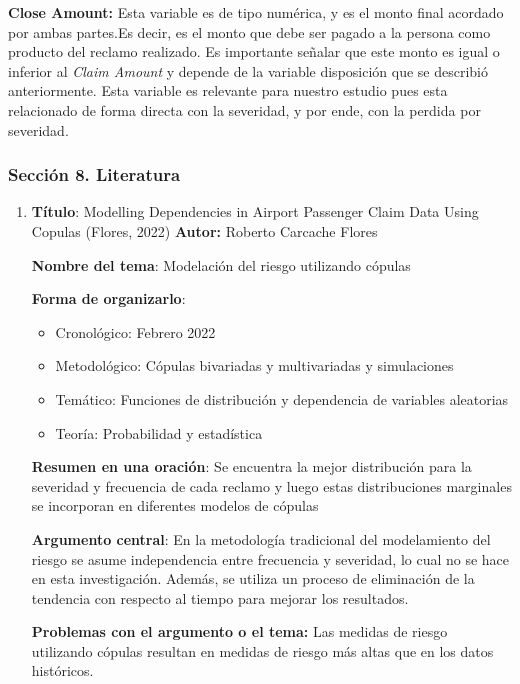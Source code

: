 \documentclass[
  letterpaper,
  onepage,
  openany]{scrreprt}
\begin{document}
\textbf{Close Amount:} Esta variable es de tipo numérica, y es el monto
final acordado por ambas partes.Es decir, es el monto que debe ser
pagado a la persona como producto del reclamo realizado. Es importante
señalar que este monto es igual o inferior al \emph{Claim Amount} y
depende de la variable disposición que se describió anteriormente. Esta
variable es relevante para nuestro estudio pues esta relacionado de
forma directa con la severidad, y por ende, con la perdida por
severidad.

\hypertarget{secciuxf3n-8.-literatura}{%
\subsubsection{Sección 8. Literatura}\label{secciuxf3n-8.-literatura}}

\begin{enumerate}
\def\labelenumi{\arabic{enumi}.}
\item
  \textbf{Título}: Modelling Dependencies in Airport Passenger Claim
  Data Using Copulas (Flores, 2022) \textbf{Autor:} Roberto Carcache
  Flores

  \textbf{Nombre del tema}: Modelación del riesgo utilizando cópulas

  \textbf{Forma de organizarlo}:

  \begin{itemize}
  \item
    Cronológico: Febrero 2022
  \item
    Metodológico: Cópulas bivariadas y multivariadas y simulaciones
  \item
    Temático: Funciones de distribución y dependencia de variables
    aleatorias
  \item
    Teoría: Probabilidad y estadística
  \end{itemize}

  \textbf{Resumen en una oración}: Se encuentra la mejor distribución
  para la severidad y frecuencia de cada reclamo y luego estas
  distribuciones marginales se incorporan en diferentes modelos de
  cópulas

  \textbf{Argumento central}: En la metodología tradicional del
  modelamiento del riesgo se asume independencia entre frecuencia y
  severidad, lo cual no se hace en esta investigación. Además, se
  utiliza un proceso de eliminación de la tendencia con respecto al
  tiempo para mejorar los resultados.

  \textbf{Problemas con el argumento o el tema:} Las medidas de riesgo
  utilizando cópulas resultan en medidas de riesgo más altas que en los
  datos históricos.


\end{enumerate}
\end{document}
